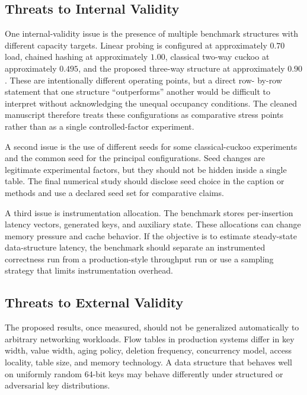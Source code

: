 \documentclass[conference]{IEEEtran}
\begin{document}
\subsection{Threats to Internal Validity}
\label{subsec:discussion_internal}

One internal-validity issue is the presence of multiple benchmark structures
with different capacity targets. Linear probing is configured at approximately
$0.70$ load, chained hashing at approximately $1.00$, classical two-way cuckoo
at approximately $0.495$, and the proposed three-way structure at approximately
$0.90$. These are intentionally different operating points, but a direct row-
by-row statement that one structure ``outperforms'' another would be difficult
to interpret without acknowledging the unequal occupancy conditions. The
cleaned manuscript therefore treats these configurations as comparative stress
points rather than as a single controlled-factor experiment.

A second issue is the use of different seeds for some classical-cuckoo
experiments and the common seed for the principal configurations. Seed changes
are legitimate experimental factors, but they should not be hidden inside a
single table. The final numerical study should disclose seed choice in the
caption or methods and use a declared seed set for comparative claims.

A third issue is instrumentation allocation. The benchmark stores per-insertion
latency vectors, generated keys, and auxiliary state. These allocations can
change memory pressure and cache behavior. If the objective is to estimate
steady-state data-structure latency, the benchmark should separate an
instrumented correctness run from a production-style throughput run or use a
sampling strategy that limits instrumentation overhead.

\subsection{Threats to External Validity}
\label{subsec:discussion_external}

The proposed results, once measured, should not be generalized automatically
to arbitrary networking workloads. Flow tables in production systems differ in
key width, value width, aging policy, deletion frequency, concurrency model,
access locality, table size, and memory technology. A data structure that
behaves well on uniformly random 64-bit keys may behave differently under
structured or adversarial key distributions.
\end{document}
